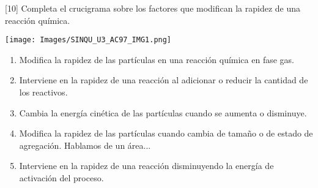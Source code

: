 [10] Completa el crucigrama sobre los factores que modifican la rapidez de una reacción química.
\begin{center}
    \texttt{[image: Images/SINQU\_U3\_AC97\_IMG1.png]}
\end{center}

\begin{enumerate}
    \item Modifica la rapidez de las partículas en una reacción química en fase gas.
    \item Interviene en la rapidez de una reacción al adicionar o reducir la cantidad de los reactivos.
    \item Cambia la energía cinética de las partículas cuando se aumenta o disminuye.
    \item Modifica la rapidez de las partículas cuando cambia de tamaño o de estado de agregación. Hablamos de un área...
    \item Interviene en la rapidez de una reacción disminuyendo la energía de activación del proceso.
\end{enumerate}